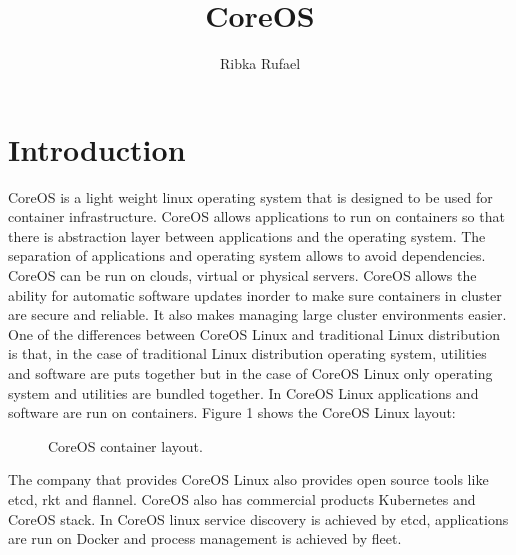 \documentclass[9pt,twocolumn,twoside]{../../styles/osajnl}
\title{CoreOS}
\author[1, *]{Ribka Rufael}
\affil[1]{School of Informatics and Computing, Bloomington, IN 47408, U.S.A.}
\affil[*]{Corresponding authors: rrufael@umail.iu.edu HID: S17-IO-3016}
\begin{document}
\maketitle

\section{Introduction}

CoreOS \cite{www-core} is a light weight linux operating system that
is designed to be used for container infrastructure. CoreOS allows
applications to run on containers so that there is abstraction layer
between applications and the operating system. The separation of
applications and operating system allows to avoid dependencies.
CoreOS can be run on clouds, virtual or physical servers. CoreOS
allows the ability for automatic software updates inorder to make sure
containers in cluster are secure and reliable. It also makes managing
large cluster environments easier. One of the differences between
CoreOS Linux and traditional Linux distribution is that, in the case
of traditional Linux distribution operating system, utilities and
software are puts together but in the case of CoreOS Linux only
operating system and utilities are bundled together. In CoreOS Linux
applications and software are run on containers. Figure 1 shows the
CoreOS Linux layout:


\begin{figure}[htbp]
\centering
{}
\caption{CoreOS container layout.  \cite{www-core} }
\label{fig:false-color}
\end{figure}

The company that provides CoreOS Linux also provides open source tools
like etcd, rkt and flannel. CoreOS also has commercial products
Kubernetes and CoreOS stack. In CoreOS linux service discovery is
achieved by etcd, applications are run on Docker and process
management is achieved by fleet.
\end{document}
